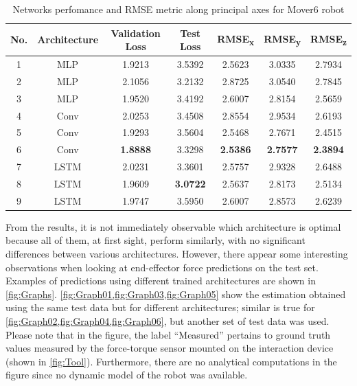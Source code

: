 \begin{table}
    \caption{Networks perfomance and RMSE metric along principal axes for Mover6 robot}
    \label{tab:ResultsMover}
    \centering
    \begin{tabular}{ccccccc}
        \toprule
        \textbf{No.} & \textbf{Architecture} & \textbf{Validation Loss} & \textbf{Test Loss} & \textbf{RMSE\textsubscript{x}} & \textbf{RMSE\textsubscript{y}} & \textbf{RMSE\textsubscript{z}} \\
        \midrule
        1 & MLP & 1.9213 & 3.5392 & 2.5623 & 3.0335 & 2.7934\\
        2 & MLP & 2.1056 & 3.2132 & 2.8725 & 3.0540 & 2.7845\\
        3 & MLP & 1.9520 & 3.4192 & 2.6007 & 2.8154 & 2.5659\\
        4 & Conv & 2.0253 & 3.4508 & 2.8554 & 2.9534 & 2.6193 \\
        5 & Conv & 1.9293 & 3.5604 & 2.5468 & 2.7671 & 2.4515\\
        6 & Conv & \textbf{1.8888} & 3.3298 & \textbf{2.5386} & \textbf{2.7577} & \textbf{2.3894} \\
        7 & LSTM & 2.0231 & 3.3601 & 2.5757 & 2.9328 & 2.6488 \\
        8 & LSTM & 1.9609 & \textbf{3.0722} & 2.5637 & 2.8173 & 2.5134\\
        9 & LSTM & 1.9747 & 3.5950 & 2.6007 & 2.8573 & 2.6239 \\
        \bottomrule
    \end{tabular}
\end{table}

From the results, it is not immediately observable which architecture is optimal because all of them, at first sight, perform similarly, with no significant differences between various architectures. However, there appear some interesting observations when looking at end-effector force predictions on the test set. Examples of predictions using different trained architectures are shown in \cref{fig:Graphs}. \cref{fig:Graph01,fig:Graph03,fig:Graph05} show the estimation obtained using the same test data but for different architectures; similar is true for \cref{fig:Graph02,fig:Graph04,fig:Graph06}, but another set of test data was used. Please note that in the figure, the label ``Measured'' pertains to ground truth values measured by the force-torque sensor mounted on the interaction device (shown in \cref{fig:Tool}). Furthermore, there are no analytical computations in the figure since no dynamic model of the robot was available.


